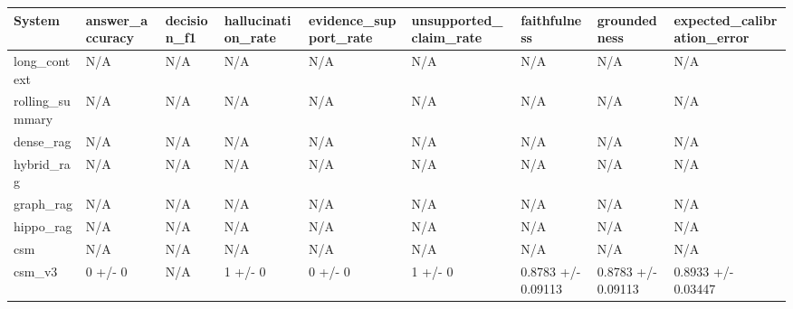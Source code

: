 \begin{tabular}{lllllllll}
System & answer_accuracy & decision_f1 & hallucination_rate & evidence_support_rate & unsupported_claim_rate & faithfulness & groundedness & expected_calibration_error \\
\hline
long\_context & N/A & N/A & N/A & N/A & N/A & N/A & N/A & N/A \\
rolling\_summary & N/A & N/A & N/A & N/A & N/A & N/A & N/A & N/A \\
dense\_rag & N/A & N/A & N/A & N/A & N/A & N/A & N/A & N/A \\
hybrid\_rag & N/A & N/A & N/A & N/A & N/A & N/A & N/A & N/A \\
graph\_rag & N/A & N/A & N/A & N/A & N/A & N/A & N/A & N/A \\
hippo\_rag & N/A & N/A & N/A & N/A & N/A & N/A & N/A & N/A \\
csm & N/A & N/A & N/A & N/A & N/A & N/A & N/A & N/A \\
csm\_v3 & 0 +/- 0 & N/A & 1 +/- 0 & 0 +/- 0 & 1 +/- 0 & 0.8783 +/- 0.09113 & 0.8783 +/- 0.09113 & 0.8933 +/- 0.03447 \\
\end{tabular}
